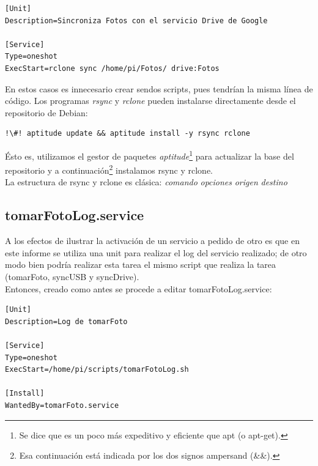 \documentclass[10pt,a4paper]{article}
\newenvironment{unitFrame}[1][]{%
    \begin{mdframed}[%
        frametitle={#1},
        skipabove=\baselineskip plus 2pt minus 1pt,
        skipbelow=\baselineskip plus 2pt minus 1pt,
        linewidth=0.5pt,
        frametitlerule=true,
        frametitlebackgroundcolor=gray!10
    ]%
}{%
    \end{mdframed}
}
\begin{document}
\begin{scriptsize}
\begin{unitFrame}[/etc/systemd/system/syncDrive.service]
\begin{verbatim}
[Unit]
Description=Sincroniza Fotos con el servicio Drive de Google

[Service]
Type=oneshot
ExecStart=rclone sync /home/pi/Fotos/ drive:Fotos
\end{verbatim}
\end{unitFrame}
\end{scriptsize}

En estos casos es innecesario crear sendos scripts, pues tendr\'ian la misma l\'inea de c\'odigo. Los programas \emph{rsync} y \emph{rclone} pueden instalarse directamente desde el repositorio de Debian:

\begin{lstlisting}
!\#! aptitude update && aptitude install -y rsync rclone
\end{lstlisting}

\'Esto es, utilizamos el gestor de paquetes \emph{aptitude}\footnote{Se dice que es un poco m\'as expeditivo y eficiente que apt (o apt-get).} para actualizar la base del repositorio y a continuaci\'on\footnote{Esa continuaci\'on est\'a indicada por los dos signos ampersand (\&\&).} instalamos rsync y rclone.\\

La estructura de rsync y rclone es cl\'asica: \emph{comando} \emph{opciones} \emph{origen} \emph{destino}

\subsection{tomarFotoLog.service}

A los efectos de ilustrar la activaci\'on de un servicio a pedido de otro es que en este informe se utiliza una unit para realizar el log del servicio realizado; de otro modo bien podr\'ia realizar esta tarea el mismo script que realiza la tarea (tomarFoto, syncUSB y syncDrive).\\

Entonces, creado como antes se procede a editar tomarFotoLog.service:

\begin{scriptsize}
\begin{unitFrame}[/etc/systemd/system/tomarFotoLog.service]
\begin{verbatim}
[Unit]
Description=Log de tomarFoto

[Service]
Type=oneshot
ExecStart=/home/pi/scripts/tomarFotoLog.sh

[Install]
WantedBy=tomarFoto.service
\end{verbatim}
\end{unitFrame}
\end{scriptsize}
\end{document}
